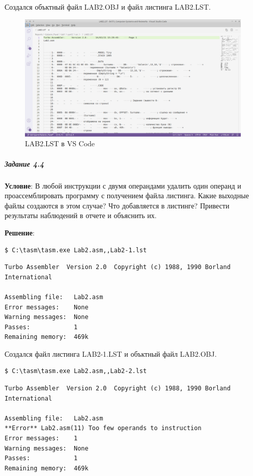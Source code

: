 Создался объктный файл LAB2.OBJ и файл листинга LAB2.LST.

\begin{figure}[h]
    \centering
    \includegraphics[width=18cm]{../_INCLUDES/lst.png}
    \caption{LAB2.LST в VS Code}
\end{figure}



\subparagraph{Задание 4.4}

\textbf{Условие}:
В любой инструкции с двумя операндами удалить один операнд и проассемблировать программу с получением файла листинга. Какие выходные файлы создаются в этом случае? Что добавляется в листинге? Привести результаты наблюдений в отчете и объяснить их.

\textbf{Решение}:

\begin{lstlisting}[language=Terminal]
$ C:\tasm\tasm.exe Lab2.asm,,Lab2-1.lst
\end{lstlisting}

\begin{lstlisting}[language=Out]
Turbo Assembler  Version 2.0  Copyright (c) 1988, 1990 Borland International

Assembling file:   Lab2.asm
Error messages:    None
Warning messages:  None
Passes:            1
Remaining memory:  469k
\end{lstlisting}

Создался файл листинга LAB2-1.LST и объктный файл LAB2.OBJ.

\begin{lstlisting}[language=Terminal]
$ C:\tasm\tasm.exe Lab2.asm,,Lab2-2.lst
\end{lstlisting}

\begin{lstlisting}[language=Out]
Turbo Assembler  Version 2.0  Copyright (c) 1988, 1990 Borland International

Assembling file:   Lab2.asm
**Error** Lab2.asm(11) Too few operands to instruction
Error messages:    1
Warning messages:  None
Passes:            1
Remaining memory:  469k
\end{lstlisting}

